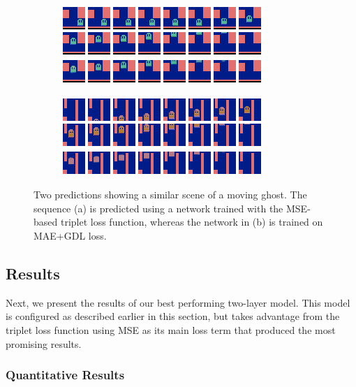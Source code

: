 \begin{figure}[h!tb]
\centering
\begin{subfigure}{0.49\textwidth}
  \centering
  \includegraphics[width=0.92\linewidth]{figures/pred/pac/blurry/pred-sharp.png}
  \caption{}
  \label{fig:pac-pred-sharp_sample}
\end{subfigure}%
\begin{subfigure}{0.49\textwidth}
  \centering
  \includegraphics[width=0.92\linewidth]{figures/pred/pac/blurry/pred-blurry.png}
  \caption{}
  \label{fig:pac-pred-blurry_sample}
\end{subfigure}
\caption[Generated MsPacman Patches using Different Loss Functions]{Two predictions showing a similar scene of a moving ghost. The sequence (a) is predicted using a network trained with the MSE-based triplet loss function, whereas the network in (b) is trained on MAE+GDL loss.} \label{fig:pac-pred-blurry}
\end{figure}


\subsection{Results}

Next, we present the results of our best performing two-layer model. This model is configured as described earlier in this section, but takes advantage from the triplet loss function using MSE as its main loss term that produced the most promising results.


\subsubsection{Quantitative Results}

